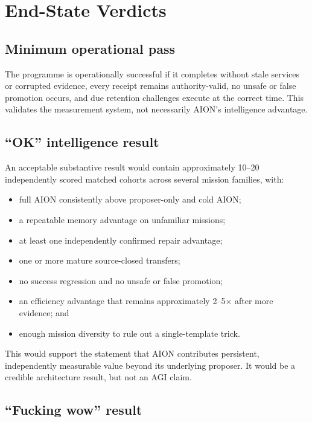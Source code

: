 \documentclass[11pt,a4paper]{article}
\begin{document}
\section{End-State Verdicts}
\label{sec:verdicts}

\subsection{Minimum operational pass}

The programme is operationally successful if it completes without stale
services or corrupted evidence, every receipt remains authority-valid, no
unsafe or false promotion occurs, and due retention challenges execute at the
correct time.  This validates the measurement system, not necessarily AION's
intelligence advantage.

\subsection{``OK'' intelligence result}

An acceptable substantive result would contain approximately 10--20
independently scored matched cohorts across several mission families, with:
\begin{itemize}
    \item full AION consistently above proposer-only and cold AION;
    \item a repeatable memory advantage on unfamiliar missions;
    \item at least one independently confirmed repair advantage;
    \item one or more mature source-closed transfers;
    \item no success regression and no unsafe or false promotion;
    \item an efficiency advantage that remains approximately 2--5$\times$
          after more evidence; and
    \item enough mission diversity to rule out a single-template trick.
\end{itemize}

This would support the statement that AION contributes persistent,
independently measurable value beyond its underlying proposer.  It would be a
credible architecture result, but not an AGI claim.

\subsection{``Fucking wow'' result}
\end{document}

